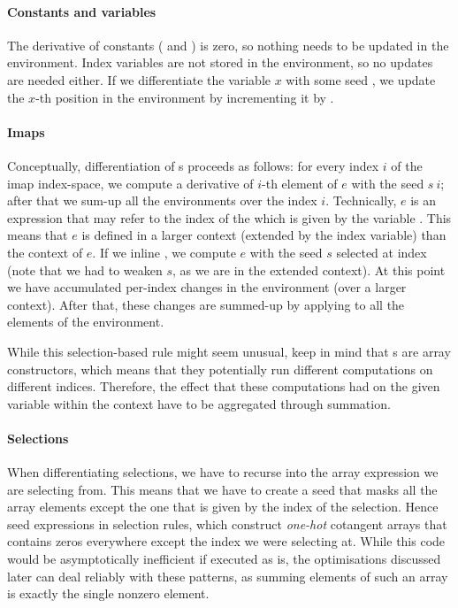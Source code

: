 \paragraph{Constants and variables} The derivative of constants ( and )
is zero, so nothing needs to be updated in the environment.  Index variables are
not stored in the environment, so no updates are needed either.  If we differentiate
the variable $x$ with some seed , we update the $x$-th position in the environment
by incrementing it by .

\paragraph{Imaps} Conceptually, differentiation of s proceeds as follows:
for every index $i$ of the imap index-space, we compute a derivative of $i$-th
element of $e$ with the seed $s\ i$; after that we sum-up all the environments
over the index $i$.  Technically, $e$ is an expression that may refer to the index
of the  which is given by the variable .  This means that $e$
is defined in a larger context (extended by the index variable) than the context
of  $e$.  If we inline , we compute  $e$ with the seed
$s$ selected at index  (note that we had to weaken $s$, as we are in
the extended context).  At this point we have accumulated per-index changes
in the environment (over a larger context).  After that, these changes are
summed-up by applying  to all the elements of the environment.

While this selection-based rule might seem unusual, keep in mind that s
are array constructors, which means that they potentially run different computations
on different indices.  Therefore, the effect that these computations had on the
given variable within the context have to be aggregated through summation.


\paragraph{Selections} When differentiating selections, we have to
recurse into the array expression we are selecting from. This means
that we have to create a seed that masks all the array elements except
the one that is given by the index of the selection. Hence seed
expressions in selection rules, which construct \emph{one-hot}
cotangent arrays that contains zeros everywhere except the index we
were selecting at. While this code would be asymptotically inefficient
if executed as is, the optimisations discussed later can deal reliably
with these patterns, as summing elements of such an array is exactly
the single nonzero element.

